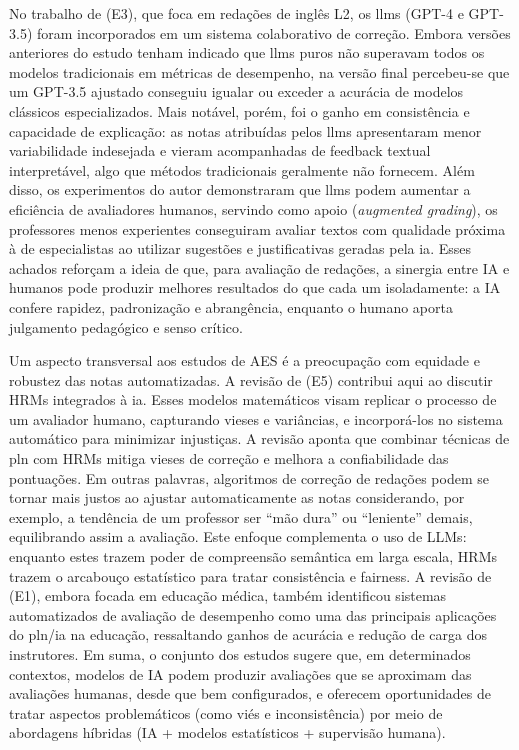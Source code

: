 No trabalho de  (E3), que foca em redações de inglês L2, os \gls{llm}s (GPT-4 e GPT-3.5) foram incorporados em um sistema colaborativo de correção. Embora versões anteriores do estudo tenham indicado que \gls{llm}s puros não superavam todos os modelos tradicionais em métricas de desempenho, na versão final percebeu-se que um GPT-3.5 ajustado conseguiu igualar ou exceder a acurácia de modelos clássicos especializados. Mais notável, porém, foi o ganho em consistência e capacidade de explicação: as notas atribuídas pelos \gls{llm}s apresentaram menor variabilidade indesejada e vieram acompanhadas de feedback textual interpretável, algo que métodos tradicionais geralmente não fornecem. Além disso, os experimentos do autor demonstraram que \gls{llm}s podem aumentar a eficiência de avaliadores humanos, servindo como apoio (\textit{augmented grading}), os professores menos experientes conseguiram avaliar textos com qualidade próxima à de especialistas ao utilizar sugestões e justificativas geradas pela \gls{ia}. Esses achados reforçam a ideia de que, para avaliação de redações, a sinergia entre IA e humanos pode produzir melhores resultados do que cada um isoladamente: a IA confere rapidez, padronização e abrangência, enquanto o humano aporta julgamento pedagógico e senso crítico.

Um aspecto transversal aos estudos de AES é a preocupação com equidade e robustez das notas automatizadas. A revisão de  (E5) contribui aqui ao discutir HRMs integrados à \gls{ia}. Esses modelos matemáticos visam replicar o processo de um avaliador humano, capturando vieses e variâncias, e incorporá-los no sistema automático para minimizar injustiças. A revisão aponta que combinar técnicas de \gls{pln} com HRMs mitiga vieses de correção e melhora a confiabilidade das pontuações. Em outras palavras, algoritmos de correção de redações podem se tornar mais justos ao ajustar automaticamente as notas considerando, por exemplo, a tendência de um professor ser “mão dura” ou “leniente” demais, equilibrando assim a avaliação. Este enfoque complementa o uso de LLMs: enquanto estes trazem poder de compreensão semântica em larga escala, HRMs trazem o arcabouço estatístico para tratar consistência e fairness. A revisão de  (E1), embora focada em educação médica, também identificou sistemas automatizados de avaliação de desempenho como uma das principais aplicações do \gls{pln}/\gls{ia} na educação, ressaltando ganhos de acurácia e redução de carga dos instrutores. Em suma, o conjunto dos estudos sugere que, em determinados contextos, modelos de IA podem produzir avaliações que se aproximam das avaliações humanas, desde que bem configurados, e oferecem oportunidades de tratar aspectos problemáticos (como viés e inconsistência) por meio de abordagens híbridas (IA + modelos estatísticos + supervisão humana).

